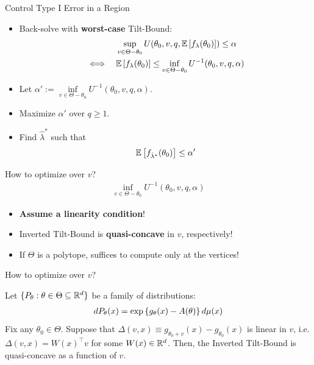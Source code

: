 \begin{frame}{Control Type I Error in a Region}
\begin{itemize}
    \item Back-solve with \textbf{worst-case} Tilt-Bound:
        \begin{align*}
            &\sup\limits_{v \in \Theta-\theta_0}
            U(\theta_0, v, q, \mathbb{E}\left[f_{\lambda}(\theta_0)\right])
            \leq 
            \alpha
            \\\iff \quad
            &\mathbb{E}\left[f_\lambda(\theta_0)\right]
            \leq 
            \inf\limits_{v \in \Theta-\theta_0}
            U^{-1}(\theta_0, v, q, \alpha)
        \end{align*}
    \item Let $\alpha' := \inf\limits_{v \in \Theta -\theta_0} U^{-1}(\theta_0, v, q, \alpha)$.
    \item Maximize $\alpha'$ over $q \geq 1$.
    \item Find $\hat{\lambda}^*$ such that 
        \begin{align*}
            \mathbb{E}\left[f_{\hat{\lambda}^*}(\theta_0)\right] \leq \alpha'
        \end{align*}
\end{itemize} 
\end{frame}

\begin{frame}{How to optimize over $v$?}
\begin{align*}
    \inf\limits_{v \in \Theta-\theta_0}
    U^{-1}(\theta_0, v, q, \alpha)
\end{align*} 
\begin{itemize}
    \item \textbf{Assume a linearity condition}!
    \item Inverted Tilt-Bound is \textbf{quasi-concave} in $v$, respectively!
    \item If $\Theta$ is a polytope, suffices to compute only at the vertices!
\end{itemize} 
\end{frame}

\begin{frame}{How to optimize over $v$?}
\begin{theorem}
Let $\{P_{\theta} : \theta \in \Theta \subseteq \mathbb{R}^d\}$ be a family of distributions:
\begin{align*}
    dP_{\theta}(x) = \exp\left\{g_{\theta}(x) - A(\theta)\right\} d\mu(x)
\end{align*}
Fix any $\theta_0 \in \Theta$.
Suppose that $\Delta(v, x) \equiv g_{\theta_0+v}(x) - g_{\theta_0}(x)$ 
is linear in $v$, i.e.
$\Delta(v, x) = W(x)^\top v$ 
for some $W(x) \in \mathbb{R}^d$.
Then, the Inverted Tilt-Bound is quasi-concave as a function of $v$.
\end{theorem}
\end{frame}

